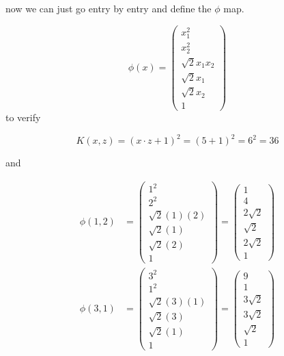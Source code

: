 \documentclass{report}
\begin{document}
now we can just go entry by entry and define the \(\phi\) map.

\begin{equation}
    \phi(x) = \begin{pmatrix} x_1^2 \\ x_2^2 \\ \sqrt{2} x_1 x_2 \\ \sqrt{2} x_1 \\ \sqrt{2} x_2 \\ 1 \end{pmatrix}
\end{equation}
to verify

\begin{equation}
    K(x, z) = (x \cdot z + 1)^2 = (5 + 1)^2 = 6^2 = 36
\end{equation}

and

\begin{equation}
    \begin{split}
        \phi(1, 2) &= \begin{pmatrix} 
            1^2 \\ 
            2^2 \\ 
            \sqrt{2}(1)(2) \\ 
            \sqrt{2}(1) \\ 
            \sqrt{2}(2) \\ 
            1 
        \end{pmatrix} = 
            \begin{pmatrix} 
            1 \\
            4 \\
            2\sqrt{2} \\
            \sqrt{2} \\
            2\sqrt{2} \\
            1 
        \end{pmatrix}\\
            \phi(3, 1) &= \begin{pmatrix} 
            3^2 \\
            1^2 \\
            \sqrt{2}(3)(1) \\
            \sqrt{2}(3) \\
            \sqrt{2}(1) \\
            1 
        \end{pmatrix} 
            = 
            \begin{pmatrix} 
            9 \\
            1 \\
            3\sqrt{2} \\
            3\sqrt{2} \\
            \sqrt{2} \\
            1 
        \end{pmatrix}
    \end{split}
\end{equation}
\end{document}
